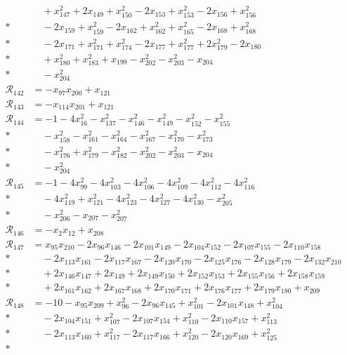 \begin{align*}
&\quad +x_{147}^{2} +2x_{149} +x_{150}^{2} -2x_{153} +x_{153}^{2} -2x_{156} +x_{156}^{2} \\*
&\quad -2x_{159} +x_{159}^{2} -2x_{162} +x_{162}^{2} +x_{165}^{2} -2x_{168} +x_{168}^{2} \\*
&\quad -2x_{171} +x_{171}^{2} +x_{174}^{2} -2x_{177} +x_{177}^{2} +2x_{179}^{2} -2x_{180} \\*
&\quad +x_{180}^{2} +x_{183}^{2} +x_{199} -x_{202}^{2} -x_{203}^{2} -x_{204} \\*
&\quad -x_{204}^{2} \\
\mathcal R_{142} &= -x_{97}x_{200} +x_{121} \\
\mathcal R_{143} &= -x_{114}x_{201} +x_{121} \\
\mathcal R_{144} &= -1 -4x_{16}^{2} -x_{137}^{2} -x_{146}^{2} -x_{149}^{2} -x_{152}^{2} -x_{155}^{2} \\*
&\quad -x_{158}^{2} -x_{161}^{2} -x_{164}^{2} -x_{167}^{2} -x_{170}^{2} -x_{173}^{2} \\*
&\quad -x_{176}^{2} +x_{179}^{2} -x_{182}^{2} -x_{202}^{2} -x_{203}^{2} -x_{204} \\*
&\quad -x_{204}^{2} \\
\mathcal R_{145} &= -1 -4x_{99}^{2} -4x_{103}^{2} -4x_{106}^{2} -4x_{109}^{2} -4x_{112}^{2} -4x_{116}^{2} \\*
&\quad -4x_{119}^{2} +x_{121}^{2} -4x_{123}^{2} -4x_{127}^{2} -4x_{130}^{2} -x_{205}^{2} \\*
&\quad -x_{206}^{2} -x_{207} -x_{207}^{2} \\
\mathcal R_{146} &= -x_{2}x_{12} +x_{208} \\
\mathcal R_{147} &= x_{95}x_{210} -2x_{96}x_{146} -2x_{101}x_{149} -2x_{104}x_{152} -2x_{107}x_{155} -2x_{110}x_{158} \\*
&\quad -2x_{113}x_{161} -2x_{117}x_{167} -2x_{120}x_{170} -2x_{125}x_{176} -2x_{128}x_{179} -2x_{132}x_{210} \\*
&\quad +2x_{146}x_{147} +2x_{149} +2x_{149}x_{150} +2x_{152}x_{153} +2x_{155}x_{156} +2x_{158}x_{159} \\*
&\quad +2x_{161}x_{162} +2x_{167}x_{168} +2x_{170}x_{171} +2x_{176}x_{177} +2x_{179}x_{180} +x_{209} \\
\mathcal R_{148} &= -10 -x_{95}x_{209} +x_{96}^{2} -2x_{96}x_{145} +x_{101}^{2} -2x_{101}x_{148} +x_{104}^{2} \\*
&\quad -2x_{104}x_{151} +x_{107}^{2} -2x_{107}x_{154} +x_{110}^{2} -2x_{110}x_{157} +x_{113}^{2} \\*
&\quad -2x_{113}x_{160} +x_{117}^{2} -2x_{117}x_{166} +x_{120}^{2} -2x_{120}x_{169} +x_{125}^{2} \\*

\end{align*}
